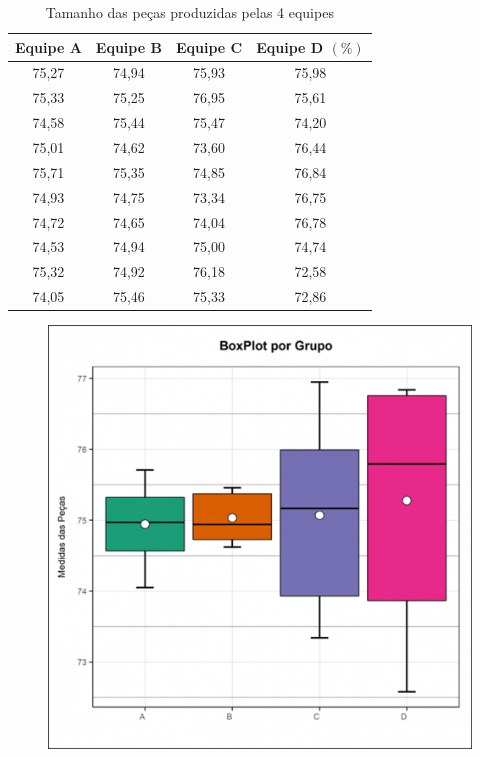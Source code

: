\documentclass[
	12pt,				%
	oneside,			%
	a4paper,			%
	english,			%
	french,				%
	spanish,			%
	brazil,				%
	]{abntex2}
\begin{document}
\begin{center}
\begin{table}[H]
\caption{Tamanho das peças produzidas pelas 4 equipes}
\begin{center}
\begin{tabular}{c|c|c|c}

\hline
Equipe A & Equipe B & Equipe C & Equipe D $(\%)$ \\ 
\hline
75,27 & 74,94 & 75,93 & 75,98 \\
\hline
75,33 & 75,25 & 76,95 & 75,61 \\
\hline
74,58 & 75,44 & 75,47 & 74,20 \\
\hline
75,01 & 74,62 & 73,60 & 76,44 \\
\hline
75,71 & 75,35 & 74,85 & 76,84 \\
\hline
74,93 & 74,75 & 73,34 & 76,75 \\
\hline
74,72 & 74,65 & 74,04 & 76,78 \\
\hline
74,53 & 74,94 & 75,00 & 74,74 \\
\hline
75,32 & 74,92 & 76,18 & 72,58 \\
\hline
74,05 & 75,46 & 75,33 & 72,86 \\

\end{tabular}
\end{center}
\end{table}
\end{center}

\begin{figure}[H]
\begin{center}

\includegraphics[scale=0.55]{grafico5.jpg}  

\end{center}
\end{figure}
\end{document}
